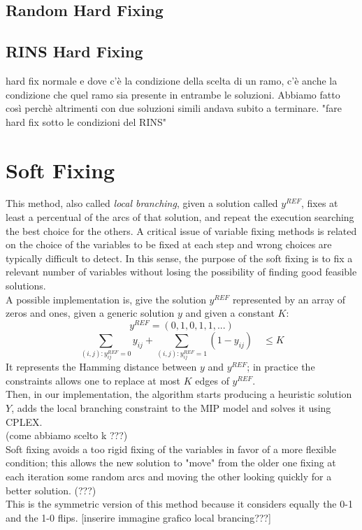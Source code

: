 \subsection{Random Hard Fixing}

\subsection{RINS Hard Fixing}
hard fix normale e dove c'è la condizione della scelta di un ramo, c'è anche la condizione che quel ramo sia presente in entrambe le soluzioni. Abbiamo fatto così perchè altrimenti con due soluzioni simili andava subito a terminare. 
"fare hard fix sotto le condizioni del RINS" 


\section{Soft Fixing}
This method, also called \textit{local branching}, given a solution called $y^{REF}$, fixes at least a percentual of the arcs of that solution, and repeat the execution searching the best choice for the others. A critical issue of variable fixing methods is related on the choice of the variables to be fixed at each step and wrong choices are typically difficult to detect. In this sense, the purpose of the soft fixing is to fix a relevant number of variables without losing the possibility of finding good feasible solutions.\\
A possible implementation is, give the solution $y^{REF}$ represented by an array of zeros and ones, given a generic solution $y$ and given a constant $K$:
\[
	y^{REF} = (0,1,0,1,1,...)
\]
\[
	\sum_{(i,j):y^{REF}_{ij}=0} y_{ij} + \sum_{(i,j):y^{REF}_{ij}=1} (1-y_{ij}) \quad \leq K
\]
It represents the Hamming distance between $y$ and $y^{REF}$; in practice the constraints allows one to replace at most $K$ edges of $y^{REF}$. \\
Then, in our implementation, the algorithm starts producing a heuristic solution $Y$, adds the local branching constraint to the MIP model and solves it using \textsc{CPLEX}.\\ (come abbiamo scelto k ???)\\
Soft fixing avoids a too rigid fixing of the variables in favor of a more flexible condition; this allows the new solution to "move" from the older one fixing at each iteration some random arcs and moving the other looking quickly for a better solution. (???)\\
This is the symmetric version of this method because it considers equally the 0-1 and the 1-0 flips. 
[inserire immagine grafico local brancing???]

